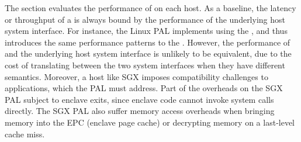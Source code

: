 The section evaluates the performance of \thehostabi{}
on each host.
As a baseline, the latency or throughput
of a \hostapi{} is always bound by the performance of the underlying host system interface.
For instance, the Linux PAL implements 
using the  \linuxapi{},
and thus introduces the same performance
patterns to the \hostapi{}.
However, the performance of \thehostabi{} and the underlying host system interface
is unlikely to be equivalent,
due to the cost of translating between
the two system interfaces
when they have different semantics. 
Moreover, a host like SGX imposes compatibility challenges
to applications,
which the PAL must address.
Part of the overheads on the SGX PAL
subject to enclave exits,
since enclave code cannot invoke system calls directly.
The SGX PAL
also suffer memory access overheads
when bringing memory into the EPC (enclave page cache)
or decrypting memory
on a last-level cache miss.





